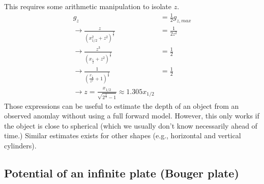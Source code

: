 \documentclass[a4paper,12pt]{article}
\begin{document}
\begin{tcolorbox}[enhanced jigsaw,breakable,pad at break*=1mm,
    colback=blue!5!white,colframe=babyblueeyes,title=Solutions]
This requires some arithmetic manipulation to isolate $z$.
\begin{eqnarray*}
g_z &=\frac{1}{2}g_{z,max} \\
\rightarrow \frac{z}{(x^2_{1/2}+z^2)^\frac{3}{2}} &= \frac{1}{2z^2}\\
\rightarrow \frac{z^3}{(x_{\frac{1}{2}}+z^2)^\frac{3}{2}}&= \frac{1}{2}\\
\rightarrow \frac{1}{(\frac{x_{\frac{1}{2}}}{z^2}+1)^\frac{3}{2}}&= \frac{1}{2}\\
\rightarrow z = \frac{x_{1/2}}{\sqrt{2^{\frac{2}{3}}-1}}\approx 1.305 x_{1/2}
\end{eqnarray*}
Those expressions can be useful to estimate the depth of an object from an observed anomlay without using a full forward model. However, this only works if the object is close to spherical (which we usually don't know necessarily ahead of time.) Similar estimates exists for other shapes (e.g., horizontal and vertical cylinders).
\end{tcolorbox}
\fi
\pagebreak
\subsection{Potential of an infinite plate (Bouger plate)}
\pagebreak
\end{document}

